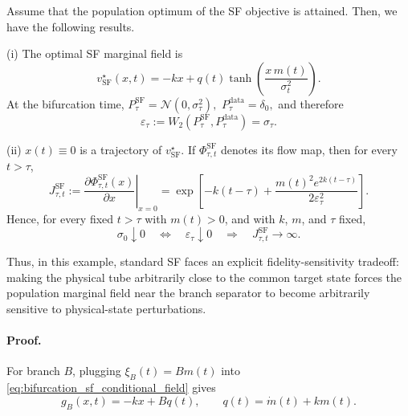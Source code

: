 \begin{vsfproposition}
\label{prop_motivate} Assume that the population optimum of the SF objective is attained.  Then, we have the following results.

(i) The optimal SF marginal field is
\begin{equation}
    v_{\mathrm{SF}}^\star(x,t)
    =
    -kx
    +
    q(t)
    \tanh\!\left(
        \frac{x\,m(t)}{\sigma_t^2}
    \right).
    \label{eq:bifurcation_sf_field}
\end{equation}
At the bifurcation time,
$P_{\tau}^{\mathrm{SF}}
    =
    \mathcal N(0,\sigma_\tau^2),$
    $P_{\tau}^{\mathrm{data}}
    =
    \delta_0,$
and therefore
\begin{equation}
    \varepsilon_\tau
    :=
    W_2\!\left(
        P_{\tau}^{\mathrm{SF}},
        P_{\tau}^{\mathrm{data}}
    \right)
    =
    \sigma_\tau.
    \label{eq:bifurcation_sf_fidelity}
\end{equation}

(ii) $x(t)\equiv0$ is a trajectory of
$v_{\mathrm{SF}}^\star$. 
  If
$\Phi_{\tau,t}^{\mathrm{SF}}$ denotes its flow map, then for every
$t>\tau$,
\begin{equation}
    J_{\tau,t}^{\mathrm{SF}}
    :=
    \left.
    \frac{\partial
        \Phi_{\tau,t}^{\mathrm{SF}}(x)}
        {\partial x}
    \right|_{x=0}
    =
    \exp\!\left[
        -k(t-\tau)
        +
        \frac{
            m(t)^2e^{2k(t-\tau)}
        }{
            2\varepsilon_\tau^2
        }
    \right].
    \label{eq:bifurcation_fidelity_sensitivity}
\end{equation}
Hence, for every fixed $t>\tau$ with $m(t)>0$, and with
$k$, $m$, and $\tau$ fixed,
\begin{equation}
    \sigma_0\downarrow0
    \quad\Longleftrightarrow\quad
    \varepsilon_\tau\downarrow0
    \quad\Longrightarrow\quad
    J_{\tau,t}^{\mathrm{SF}}\to\infty.
    \label{eq:bifurcation_tradeoff_limit}
\end{equation}
\end{vsfproposition} 
Thus, in this example, standard SF faces
an explicit fidelity-sensitivity tradeoff: making the physical tube
arbitrarily close to the common target state forces the population
marginal field near the branch separator to become arbitrarily sensitive
to physical-state perturbations.

\paragraph{Proof.}
For branch $B$, plugging $\xi_B(t)=Bm(t)$ into
\eqref{eq:bifurcation_sf_conditional_field} gives
\begin{equation}
    g_B(x,t)
    =
    -kx+Bq(t),
    \qquad
    q(t)=\dot m(t)+km(t).
    \label{eq:bifurcation_sf_branch_field}
\end{equation}


